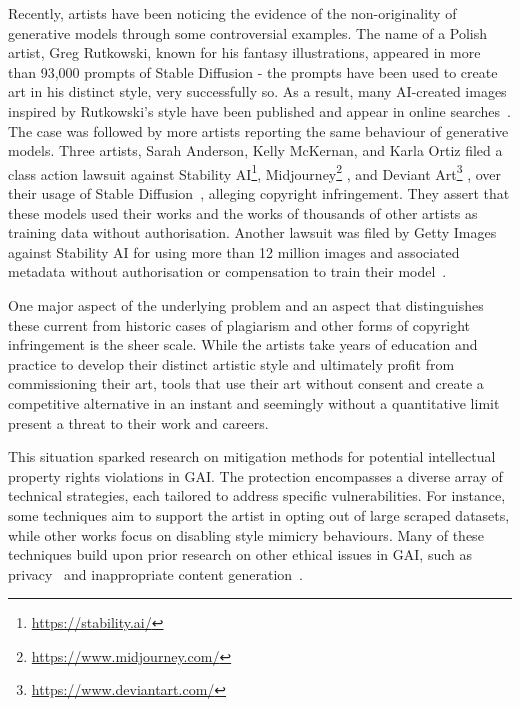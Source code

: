 \documentclass[conference]{IEEEtran}
\begin{document}
Recently, artists have been noticing the evidence of the non-originality of generative models through some controversial examples. 
The name of a Polish artist, Greg Rutkowski, known for his fantasy illustrations, appeared in more than 93,000 prompts of Stable Diffusion - the prompts have been used to create art in his distinct style, very successfully so. 
As a result, many AI-created images inspired by Rutkowski's style have been published and appear in online searches~\cite{mit_technology_review_this_2022}. The case was followed by more artists reporting the same behaviour of generative models. 
Three artists, Sarah Anderson, Kelly McKernan, and Karla Ortiz filed a class action lawsuit against Stability AI\footnote{\url{https://stability.ai/}}, Midjourney\footnote{\url{https://www.midjourney.com/}}%
, and Deviant Art\footnote{\url{https://www.deviantart.com/}}%
, over their usage of Stable Diffusion~\cite{rombach_high-resolution_2022}, alleging copyright infringement. They assert that these models used their works and the works of thousands of other artists as training data without authorisation.
Another lawsuit was filed by Getty Images against Stability AI for using more than 12 million images and associated metadata without authorisation or compensation to train their model~\cite{nolan_ai_2023}.

One major aspect of the underlying problem and an aspect that distinguishes these current from historic cases of plagiarism and other forms of copyright infringement is the sheer scale.
While the artists take years of education and practice to develop their distinct artistic style and ultimately profit from commissioning their art, tools that use their art without consent and create a competitive alternative in an instant and seemingly without a quantitative limit present a threat to their work and careers.

This situation sparked research on mitigation methods for potential intellectual property rights violations in GAI. 
The protection encompasses a diverse array of technical strategies, each tailored to address specific vulnerabilities.
For instance, some techniques aim to support the artist in opting out of large scraped datasets, while other works focus on disabling style mimicry behaviours. 
Many of these techniques build upon prior research on other ethical issues in GAI, such as privacy~\cite{matsumoto_membership_2023} 
and inappropriate content generation~\cite{gandikota_erasing_2023}.
\end{document}
